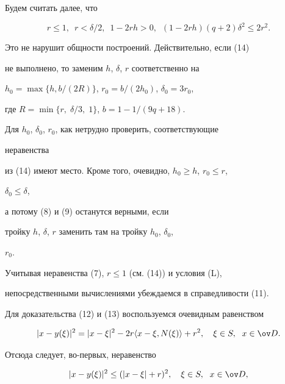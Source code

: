  


\begin{pf} 


Будем считать далее, что 


\begin{equation} 


r\le 1, \ \; r<\delta/2, \ \; 1-2r h>0, 


\ \; (1-2r h)(q+2)\delta^2\le2r^2. 


\end{equation} 


Это не нарушит общности построений. Действительно, если (14) 


не выполнено, то заменим $h$, $\delta$, $r$ соответственно на 


$h_0=\max\{h,b/(2R)\}$, $r_0=b/(2h_0)$, $\delta_0=3r_0$, 


где $R=\min\{r,\;\delta/3,\;1\}$, $b=1-1/(9q+18)$. 


Для $h_0$, $\delta_0$, $r_0$, как нетрудно проверить, соответствующие 


неравенства 


из (14) имеют место. Кроме того, очевидно, $h_0\ge h$, $r_0\le r$, 


$\delta_0\le\delta$, 


а потому (8) и (9) останутся верными, если 


тройку $h$, $\delta$, $r$ заменить там на тройку $h_0$, $\delta_0$, 


$r_0$. 


 


Учитывая неравенства (7), $r\le1$ (см. (14)) и условия (L), 


непосредственными вычислениями убеждаемся в справедливости (11). 


Для доказательства (12) и (13) воспользуемся очевидным равенством 


$$ 


|x-y(\xi)|^2=|x-\xi|^2-2r\la x-\xi,N(\xi)\ra+r^2,\quad 


\xi\in S,\ \; x\in\ov D. 


$$ 


Отсюда следует, во-первых, неравенство 


\begin{equation} 


|x-y(\xi)|^2\le(|x-\xi|+r)^2,\quad \xi\in S,\ \; x\in\ov D, 


\end{equation} 



\end{pf}

